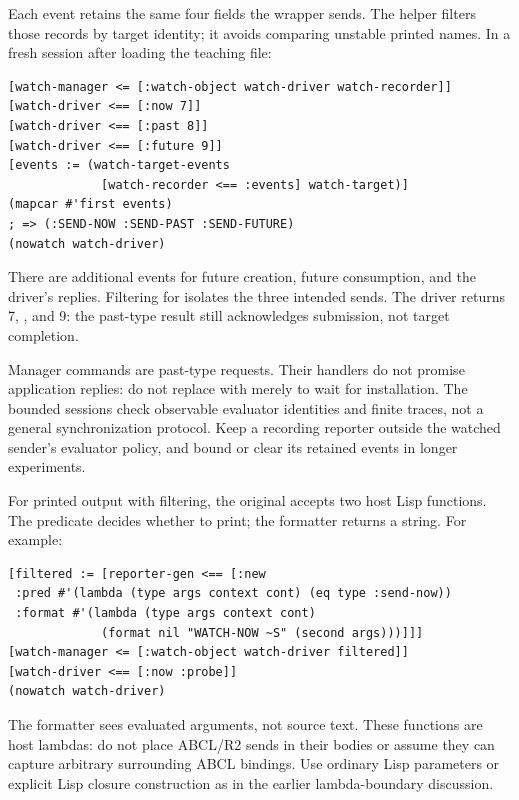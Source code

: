 
Each event retains the same four fields the wrapper sends. The helper
 filters those records by target identity;
it avoids comparing unstable printed names. In a fresh session after
loading the teaching file:

\begin{codeblock}
\begin{lstlisting}
[watch-manager <= [:watch-object watch-driver watch-recorder]]
[watch-driver <== [:now 7]]
[watch-driver <== [:past 8]]
[watch-driver <== [:future 9]]
[events := (watch-target-events
             [watch-recorder <== :events] watch-target)]
(mapcar #'first events)
; => (:SEND-NOW :SEND-PAST :SEND-FUTURE)
(nowatch watch-driver)
\end{lstlisting}
\end{codeblock}

There are additional events for future creation, future consumption, and
the driver's replies. Filtering for  isolates the
three intended sends. The driver returns 7, , and 9:
the past-type result still acknowledges submission, not target completion.

Manager commands are past-type requests. Their handlers do not promise
application replies: do not replace \code{<=} with \code{<==} merely
to wait for installation. The bounded sessions check observable evaluator
identities and finite traces, not a general synchronization protocol.
Keep a recording reporter outside the watched sender's evaluator policy,
and bound or clear its retained events in longer experiments.

For printed output with filtering, the original 
accepts two host Lisp functions. The predicate decides whether to print;
the formatter returns a string. For example:

\begin{codeblock}
\begin{lstlisting}
[filtered := [reporter-gen <== [:new
 :pred #'(lambda (type args context cont) (eq type :send-now))
 :format #'(lambda (type args context cont)
             (format nil "WATCH-NOW ~S" (second args)))]]]
[watch-manager <= [:watch-object watch-driver filtered]]
[watch-driver <== [:now :probe]]
(nowatch watch-driver)
\end{lstlisting}
\end{codeblock}

The formatter sees evaluated arguments, not source text. These functions
are host lambdas: do not place ABCL/R2 sends in their bodies or assume they
can capture arbitrary surrounding ABCL bindings. Use ordinary Lisp
parameters or explicit Lisp closure construction as in the earlier
lambda-boundary discussion.

